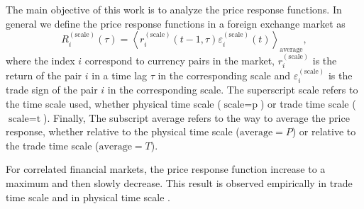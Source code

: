 The main objective of this work is to analyze the price response functions. In
general we define the price response functions in a foreign exchange market as
\begin{equation}\label{eq:response_general}
    R^{\left(\textrm{scale}\right)}_{i}\left(\tau\right)=\left\langle
    r^{\left(\textrm{scale}\right)}_{i}\left(t-1, \tau\right)
    \varepsilon^{\left(\textrm{scale}\right)}_{i} \left(t\right)\right\rangle
    _{\textrm{average}},
\end{equation}
where the index $i$ correspond to currency pairs in the market,
$r^{\left(\textrm{scale}\right)}_{i}$ is the return of the pair $i$ in a time
lag $\tau$ in the corresponding scale and
$\varepsilon^{\left(\textrm{scale}\right)}_{i}$ is the trade sign of the pair
$i$ in the corresponding scale. The superscript scale refers to the time scale
used, whether physical time scale ($\textrm{scale} = \textrm{p}$) or trade time
scale ($\textrm{scale} = \textrm{t}$). Finally, The subscript average refers to
the way to average the price response, whether relative to the physical time
scale ($\textrm{average} = P$) or relative to the trade time scale
($\textrm{average} = T$).

For correlated financial markets, the price response function increase to a
maximum and then slowly decrease. This result is observed empirically in trade
time scale and in physical time scale
\cite{my_paper_response_financial,Wang_2016_avg}.